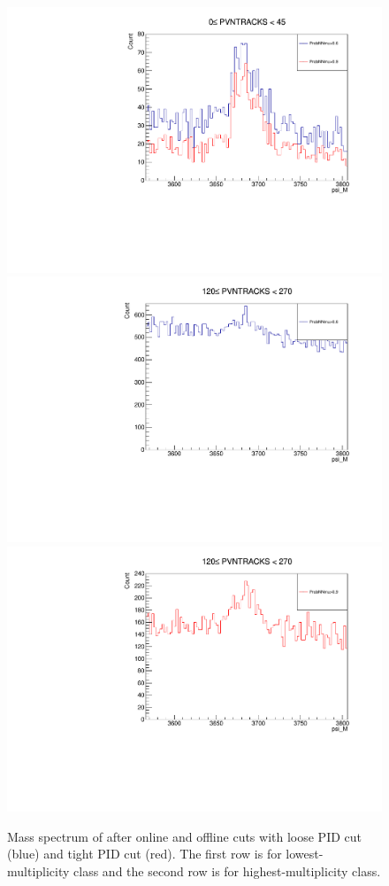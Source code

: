 \begin{figure}[!tbp]
\begin{center}
\includegraphics[width=0.7\linewidth]{pdf/pPb/Workdir/Psi_M_ProbNNmu/Low.pdf}
\includegraphics[width=0.49\linewidth]{pdf/pPb/Workdir/Psi_M_ProbNNmu/High1.pdf}
\includegraphics[width=0.49\linewidth]{pdf/pPb/Workdir/Psi_M_ProbNNmu/High2.pdf}
\end{center}
\caption{
	Mass spectrum of \psitwos after online and offline cuts with loose PID cut (blue) and tight PID cut (red). The first row is for lowest-multiplicity class and the second row is for highest-multiplicity class.}
\label{ProbNNmu}
\end{figure}

